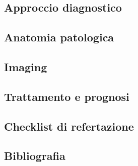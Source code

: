 \subsection{Approccio diagnostico}

\subsection{Anatomia patologica}

\subsection{Imaging}

\subsection{Trattamento e prognosi}

\subsection{Checklist di refertazione}

\subsection{Bibliografia}
\small{
	
	
}

